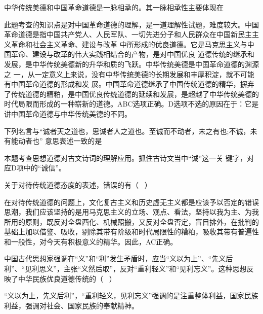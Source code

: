 \question 中华传统美德和中国革命道德是一脉相承的。其一脉相承性主要体现在
\par{}
\begin{solution}此题考查的知识点是对中国革命道德的理解，是一道理解性试题，难度较大。中国革命道德是指中国共产党人、人民军队、一切先进分子和人民群众在中国新民主主义革命和社会主义革命、建设与改革
中所形成的优良道德。它是马克思主义与中国革命、建设与改革的伟大实践相结合的产物，是对中国优良
道德传统的继承和发展，是中华传统美德新的升华和质的飞跃。中华传统美德是中国革命道德的渊源之
一，从一定意义上来说，没有中华传统美德的长期发展和丰厚积淀，就不可能有中国革命道德的形成和发
展。中国革命道德继承了中国传统道德的精华，摒弃了传统道德的糟粕，是中国优良传统道德的延续和发展，是超越了中华传统美德的时代局限而形成的一种崭新的道德。ABC选项正确。D选项不选的原因在于：它是讲中国革命道德与中华传统美德的不同。
\end{solution}
\question 下列名言与``诚者天之道也，思诚者人之道也。至诚而不动者，未之有也;不诚，未有能动者也''
意思表述一致的是
\par{}
\begin{solution}本题考查思想道德对古文诗词的理解应用。抓住古诗文当中``诚''这一关
键字，对应D项中的``诚信''。
\end{solution}
\question 关于对待传统道德态度的表述，错误的有（ ~）
\par{}
\begin{solution}在对待传统道德的问题上，文化复古主义和历史虚无主义都是应该予以否定的错误思潮，我们应该坚持的是用马克思主义的立场、观点、看法，坚持以我为主、为我所用的原则，既反对全盘西化、机械照搬，又反对全盘否定，盲目排外，在批判的基础上加以借鉴、吸收，剔除其带有阶级和时代局限性的糟粕，吸收其带有普遍性和一般性，对今天有积极意义的精华。因此，AC正确。
\end{solution}
\question 中国古代思想家强调在``义''和``利''发生矛盾时，应当``义以为上''、``先义后利''、``见利思义''，主张``义然后取''，反对``重利轻义''和``见利忘义''。这种思想反映了中华民族优良道德传统的（
~）
\par{}
\begin{solution}``义以为上，先义后利''，``重利轻义，见利忘义''强调的是注重整体利益，国家民族利益，强调对社会、国家民族的奉献精神。
\end{solution}
